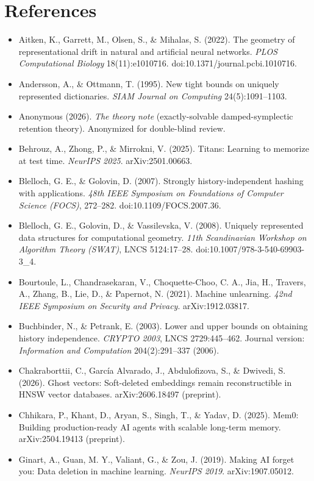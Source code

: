 \documentclass{article}
\begin{document}
\section*{References}
{\begin{itemize}
\item Aitken, K., Garrett, M., Olsen, S., \& Mihalas, S. (2022). The geometry of representational drift in natural and artificial neural networks. \emph{PLOS Computational Biology} 18(11):e1010716. doi:10.1371/journal.pcbi.1010716.
\item Andersson, A., \& Ottmann, T. (1995). New tight bounds on uniquely represented dictionaries. \emph{SIAM Journal on Computing} 24(5):1091--1103.
\item Anonymous (2026). \emph{The theory note} (exactly-solvable damped-symplectic retention theory). Anonymized for double-blind review.
\item Behrouz, A., Zhong, P., \& Mirrokni, V. (2025). Titans: Learning to memorize at test time. \emph{NeurIPS 2025}. arXiv:2501.00663.
\item Blelloch, G. E., \& Golovin, D. (2007). Strongly history-independent hashing with applications. \emph{48th IEEE Symposium on Foundations of Computer Science (FOCS)}, 272--282. doi:10.1109/FOCS.2007.36.
\item Blelloch, G. E., Golovin, D., \& Vassilevska, V. (2008). Uniquely represented data structures for computational geometry. \emph{11th Scandinavian Workshop on Algorithm Theory (SWAT)}, LNCS 5124:17--28. doi:10.1007/978-3-540-69903-3\_4.
\item Bourtoule, L., Chandrasekaran, V., Choquette-Choo, C. A., Jia, H., Travers, A., Zhang, B., Lie, D., \& Papernot, N. (2021). Machine unlearning. \emph{42nd IEEE Symposium on Security and Privacy}. arXiv:1912.03817.
\item Buchbinder, N., \& Petrank, E. (2003). Lower and upper bounds on obtaining history independence. \emph{CRYPTO 2003}, LNCS 2729:445--462. Journal version: \emph{Information and Computation} 204(2):291--337 (2006).
\item Chakraborttii, C., Garc\'ia Alvarado, J., Abdulofizova, S., \& Dwivedi, S. (2026). Ghost vectors: Soft-deleted embeddings remain reconstructible in HNSW vector databases. arXiv:2606.18497 (preprint).
\item Chhikara, P., Khant, D., Aryan, S., Singh, T., \& Yadav, D. (2025). Mem0: Building production-ready AI agents with scalable long-term memory. arXiv:2504.19413 (preprint).
\item Ginart, A., Guan, M. Y., Valiant, G., \& Zou, J. (2019). Making AI forget you: Data deletion in machine learning. \emph{NeurIPS 2019}. arXiv:1907.05012.

\end{itemize}}
\end{document}
